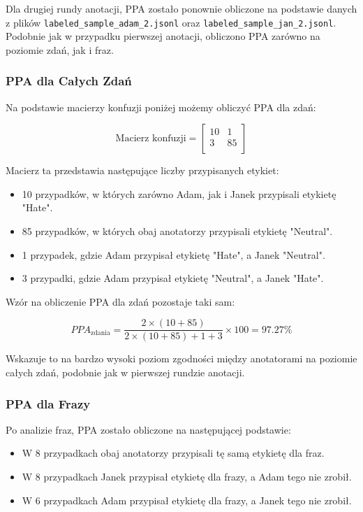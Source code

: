 \documentclass[12pt]{article}
\begin{document}
Dla drugiej rundy anotacji, PPA zostało ponownie obliczone na podstawie danych z plików \texttt{labeled\_sample\_adam\_2.jsonl} oraz \texttt{labeled\_sample\_jan\_2.jsonl}. Podobnie jak w przypadku pierwszej anotacji, obliczono PPA zarówno na poziomie zdań, jak i fraz.

\subsubsection{PPA dla Całych Zdań}

Na podstawie macierzy konfuzji poniżej możemy obliczyć PPA dla zdań:

\[
\text{Macierz konfuzji} =
\begin{bmatrix}
10 & 1 \\
3 & 85 \\
\end{bmatrix}
\]

Macierz ta przedstawia następujące liczby przypisanych etykiet:
\begin{itemize}
    \item 10 przypadków, w których zarówno Adam, jak i Janek przypisali etykietę "Hate".
    \item 85 przypadków, w których obaj anotatorzy przypisali etykietę "Neutral".
    \item 1 przypadek, gdzie Adam przypisał etykietę "Hate", a Janek "Neutral".
    \item 3 przypadki, gdzie Adam przypisał etykietę "Neutral", a Janek "Hate".
\end{itemize}

Wzór na obliczenie PPA dla zdań pozostaje taki sam:

\begin{dmath}
PPA_{\text{zdania}} = \frac{2 \times (10 + 85)}{2 \times (10 + 85) + 1 + 3} \times 100 = 97.27\%
\end{dmath}

Wskazuje to na bardzo wysoki poziom zgodności między anotatorami na poziomie całych zdań, podobnie jak w pierwszej rundzie anotacji.

\subsubsection{PPA dla Frazy}

Po analizie fraz, PPA zostało obliczone na następującej podstawie:
\begin{itemize}
    \item W 8 przypadkach obaj anotatorzy przypisali tę samą etykietę dla fraz.
    \item W 8 przypadkach Janek przypisał etykietę dla frazy, a Adam tego nie zrobił.
    \item W 6 przypadkach Adam przypisał etykietę dla frazy, a Janek tego nie zrobił.
\end{itemize}
\end{document}
